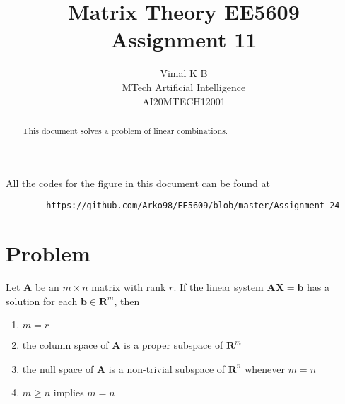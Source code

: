\documentclass[journal,12pt,twocolumn]{IEEEtran}
\begin{document}
	\makeatletter
	\makeatother
	\let\StandardTheFigure\thefigure
	\let\vec\mathbf
	\renewcommand{\thefigure}{\theproblem}
	\def\putbox#1#2#3{\makebox[0in][l]{\makebox[#1][l]{}\raisebox{\baselineskip}[0in][0in]{\raisebox{#2}[0in][0in]{#3}}}}
	\def\rightbox#1{\makebox[0in][r]{#1}}
	\def\centbox#1{\makebox[0in]{#1}}
	\def\topbox#1{\raisebox{-\baselineskip}[0in][0in]{#1}}
	\def\midbox#1{\raisebox{-0.5\baselineskip}[0in][0in]{#1}}
	\vspace{3cm}
	\title{Matrix Theory EE5609\\  Assignment 11}
	\author{Vimal K B\\MTech Artificial Intelligence\\AI20MTECH12001}
	\maketitle
	\newpage
	\bigskip
	\renewcommand{\thefigure}{\theenumi}
	\renewcommand{\thetable}{\theenumi}
	\begin{abstract}
		This document solves a problem of linear combinations. 
	\end{abstract}
	All the codes for the figure in this document can be found at
	\begin{lstlisting}
		https://github.com/Arko98/EE5609/blob/master/Assignment_24
	\end{lstlisting}
	\section{\textbf{Problem}}
	Let $\vec{A}$ be an $m\times n$ matrix with rank $r$. If the linear system $\vec{A}\vec{X} = \vec{b}$ has a solution for each $\vec{b} \in \mathbf{R}^{m}$, then
	\begin{enumerate}
		\item $m=r$
		\item the column space of $\vec{A}$ is a proper subspace of $\mathbf{R}^{m}$ 
		\item the null space of $\vec{A}$ is a non-trivial subspace of $\mathbf{R}^{n}$ whenever $m=n$
		\item $m\geq n$ implies $m=n$
	\end{enumerate}
\end{document}
